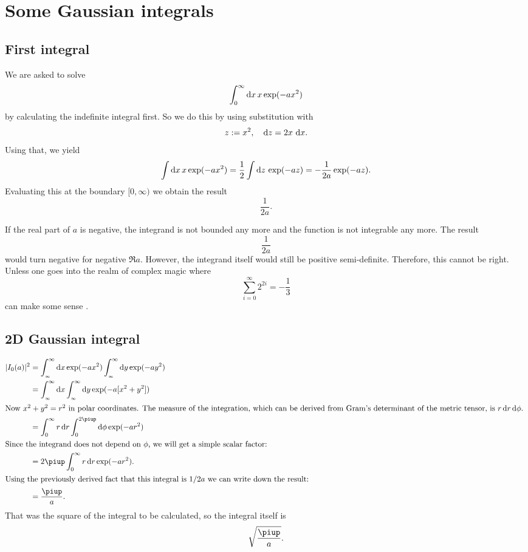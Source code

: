 \documentclass[11pt, english, fleqn, DIV=15, headinclude, BCOR=1cm]{scrartcl}
\begin{document}
\section{Some Gaussian integrals} %

\subsection{First integral}

We are asked to solve
\[
    \int_0^\infty \mathop{}\!\mathrm d x \, x \exp(-ax^2)
\]
by calculating the indefinite integral first. So we do this by using
substitution with
\[
    z := x^2
    ,\quad
    \mathop{}\!\mathrm d z = 2 x \, \mathop{}\!\mathrm d x.
\]
Using that, we yield
\[
    \int \mathop{}\!\mathrm d x \, x \exp(-ax^2) = \frac{1}{2} \int \mathop{}\!\mathrm d z \, \exp(-az) = -
    \frac{1}{2a} \exp(-az).
\]
Evaluating this at the boundary $[0, \infty)$ we obtain the result
\[
    \frac{1}{2a}.
\]

If the real part of $a$ is negative, the integrand is not bounded any more and
the function is not integrable any more. The result
\[
    \frac{1}{2a}
\]
would turn negative for negative $\Re a$. However, the integrand itself would
still be positive semi-definite. Therefore, this cannot be right. Unless one
goes into the realm of complex magic where
\[
    \sum_{i = 0}^\infty 2^{2i} = - \frac{1}{3}
\]
can make some sense \parencite[78]{penrose-road_to_reality}.

\subsection{2D Gaussian integral}

\begin{align*}
    |I_0(a)|^2
    &=
    \int_{_\infty}^\infty \dif x \exp(-ax^2)
    \int_{_\infty}^\infty \dif y \exp(-ay^2) \\
    &=
    \int_{_\infty}^\infty \dif x \int_{_\infty}^\infty \dif y \exp(-a[x^2+y^2]) \\
    \intertext{%
        Now $x^2 + y^2 = r^2$ in polar coordinates. The measure of the
        integration, which can be derived from Gram's determinant of the
        metric tensor, is $r \dif r \dif \phi$.
    }
    &= \int_0^\infty r \dif r \int_0^{2\piup} \dif \phi \exp(-ar^2) \\
    \intertext{%
        Since the integrand does not depend on $\phi$, we will get a simple
        scalar factor:
    }
    &= 2 \piup \int_0^\infty r \dif r \exp(-ar^2). \\
    \intertext{%
        Using the previously derived fact that this integral is $1/2a$ we can
        write down the result:
    }
    &= \frac{\piup}a.
\end{align*}
That was the square of the integral to be calculated, so the integral itself is
\[
    \sqrt{\frac\piup a}.
\]
\end{document}
